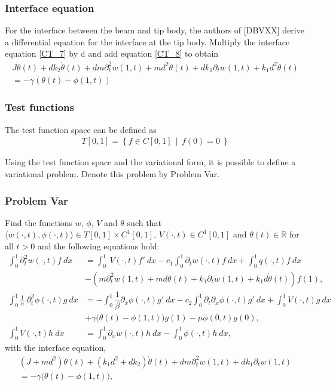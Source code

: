\documentclass[../../main.tex]{subfiles}
\begin{document}
\subsubsection{Interface equation}
For the interface between the beam and tip body, the authors of [DBVXX] derive a differential equation for the interface at the tip body. Multiply the interface equation \eqref{CT_7} by d and add equation \eqref{CT_8} to obtain
\begin{align}
 J\ddot{\theta}(t) + dk_2\dot{\theta}(t) + dm\partial_t^2w(1,t) + md^2\ddot{\theta}(t) + dk_1\partial_tw(1,t) + k_1d^2\dot{\theta}(t)\nonumber \\
 = - \gamma(\theta(t)-\phi(1,t)) \label{CT_16}
\end{align}

\subsubsection*{Test functions}
The test function space can be defined as
\begin{align}
T[0,1] = \left\{ f \in C[0,1] ~~ | ~~ f(0)= 0~\right\} \label{CT_17}
\end{align}

Using the test function space and the variational form, it is possible to define a variational problem. Denote this problem by Problem Var.

\subsubsection{Problem Var} Find the functions $w$, $\phi$, $V$ and $\theta$ such that $\langle w(\cdot,t), \phi(\cdot,t) \rangle \in T[0,1] \times C^1[0,1]$, $V(\cdot,t) \in C^1[0,1]$ and $\theta(t) \in \mathbb{R}$ for all $t>0$ and the following equations hold:
\begin{align}
\int_0^1 \partial^2_t w(\cdot,t) f \ dx  & =   \int_0^1~ V(\cdot,t) f' \ dx - c_1\int_0^1 \partial_t w(\cdot,t)f \ dx + \int_0^1q(\cdot,t)f \ dx \nonumber \\
 &  -(m \partial_t^2 w(1,t) +  md \ddot \theta(t) + k_1 \partial_t w(1,t) + k_1 d \dot \theta(t))f(1), \label{CT_18}\\
\int_0^1 \frac{1}{\alpha}~\partial^2_t \phi(\cdot,t) g \ dx  &= -\int_0^1\dfrac{1}{\beta} \partial_x \phi(\cdot,t)g' \ dx - c_2 \int_0^1 \partial_t \partial_x \phi(\cdot,t)g' \ dx + \int_0^1 V(\cdot,t)g \ dx \nonumber \\
 &  +\gamma \big(\theta(t) - \phi(1,t)\big)g(1) - \mu \phi(0,t)g(0), \label{CT_19}\\
\int_0^1 V(\cdot,t)h \ dx &= \int_0^1 \partial_x w(\cdot,t)h \ dx - \int_0^1 \phi(\cdot,t)h \ dx,  \label{CT_20}
\end{align}
with the interface equation,
\begin{align}
(J+ md^2) \ddot \theta(t)+ (k_1d^2 + d k_2) \dot \theta(t)  + dm \partial_t^2 w(1,t)
  + dk_1 \partial_t w(1,t) \nonumber\\
  =  -\gamma \big(\theta(t) - \phi(1,t)\big),  \label{CT_21}
\end{align}
\end{document}
